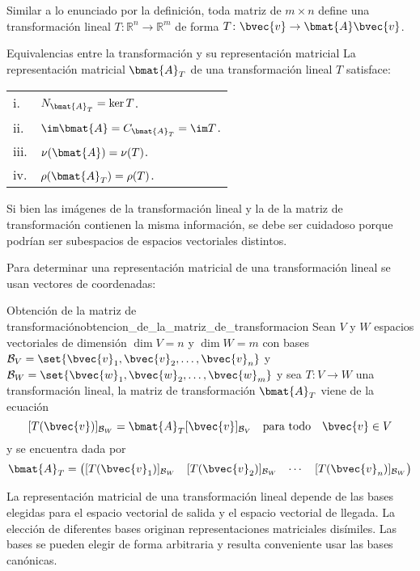 \documentclass{fmbnotes}
\begin{document}
Similar a lo enunciado por la definición, toda matriz de \(m\times n \) define una transformación lineal \(T\colon \mathbb{R}^{n}\to\mathbb{R}^{m}\) de forma \(T\colon \bvec{v}\to\bmat{A}\bvec{v}\).

\begin{teorema}{Equivalencias entre la transformación y su representación matricial}{}
	La representación matricial \(\bmat{A}_T\) de una transformación lineal \(T\) satisface:
	\begin{longtable}{lp{}}
		\rule[1ex]{0pt}{2.5ex}i.&\(N_{\bmat{A}_T}=\ker T\). \\
		\rule[1ex]{0pt}{2.5ex}ii.&\(\im \bmat{A}=C_{\bmat{A}_T}=\im T\).\\
		\rule[1ex]{0pt}{2.5ex}iii.&\(\nu(\bmat{A})=\nu(T)\). \\
		\rule[1ex]{0pt}{2.5ex}iv.&\(\rho(\bmat{A}_T)=\rho(T)\).
	\end{longtable}
\end{teorema}

\begin{advertencia}
	Si bien las imágenes de la transformación lineal y la de la matriz de transformación contienen la misma información, se debe ser cuidadoso porque podrían ser subespacios de espacios vectoriales distintos.
\end{advertencia}

Para determinar una representación matricial de una transformación lineal se usan vectores de coordenadas:
\begin{teorema}{Obtención de la matriz de transformación}{obtencion_de_la_matriz_de_transformacion}
	Sean \(V\) y \(W\) espacios vectoriales de dimensión \(\dim V=n\) y \(\dim W=m\) con bases \(\mathcal{B}_V=\set{\bvec{v}_1,\bvec{v}_2,\ldots,\bvec{v}_n}\) y \(\mathcal{B}_W=\set{\bvec{w}_1,\bvec{w}_2,\ldots,\bvec{w}_m}\) y sea \(T:V\to W\) una transformación lineal, la matriz de transformación \(\bmat{A}_T\) viene de la ecuación
	\[[T(\bvec{v})]_{\mathcal{B}_W}=\bmat{A}_T[\bvec{v}]_{\mathcal{B}_V} \quad \text{para todo} \quad \bvec{v}\in V\]
	y se encuentra dada por
	\[\bmat{A}_T=\begin{pmatrix}
			[T(\bvec{v}_1)]_{\mathcal{B}_W} & [T(\bvec{v}_2)]_{\mathcal{B}_W} & \cdots & [T(\bvec{v}_n)]_{\mathcal{B}_W}
		\end{pmatrix}\]
\end{teorema}

La representación matricial de una transformación lineal depende de las bases elegidas para el espacio vectorial de salida y el espacio vectorial de llegada. La elección de diferentes bases originan representaciones matriciales disímiles. Las bases se pueden elegir de forma arbitraria y resulta conveniente usar las bases canónicas.
\end{document}
